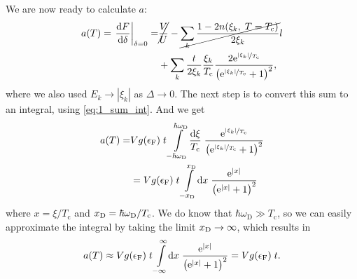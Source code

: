 \documentclass[11pt,letter, swedish, english
]{article}
\newcommand{\Tc}{\ensuremath{T_{\text{c}}}}
\newcommand{\eF}{\ensuremath{\epsilon_{\text{F}}}}
\newcommand{\wD}{\ensuremath{\omega_{\text{D}}}}
\begin{document}
We are now ready to calculate $a$:
\begin{equation}
\begin{aligned}
a(T)=\eval{\dv{F}{\delta}}_{\delta=0}
=&\cancel{\frac{V}{U}}
-\cancel{\sum_k\frac{1-2n(\xi_k,\;T=\Tc)}{2\xi_k}}l\\
&+\sum_k\frac{t}{2\xi_k}\frac{\xi_k}{\Tc}
\frac{2\ee^{\nicefrac{|\xi_k|}{\Tc}}}{\qty(\ee^{\nicefrac{|\xi_k|}{\Tc}}+1)^2},
\end{aligned}
\end{equation}
where we also used $E_k\to|\xi_k|$ as $\Delta\to0$.
The next step is to convert this sum to an integral, using
\eqref{eq:1_sum_int}. 
And we get
\begin{equation}
\begin{aligned}
a(T)=&Vg(\eF)\;t\int_{-\hbar\wD}^{\hbar\wD}\!\frac{\rd\xi}{\Tc}\;
\frac{\ee^{\nicefrac{|\xi_k|}{\Tc}}}{\qty(\ee^{\nicefrac{|\xi_k|}{\Tc}}+1)^2}\\
&=Vg(\eF)\;t\int_{-\xD}^{\xD}\!\rd{x}\;
\frac{\ee^{|x|}}{\qty(\ee^{|x|}+1)^2}\\
\end{aligned}
\end{equation}
where $x=\xi/\Tc$ and $\xD=\hbar\wD/\Tc$. We do know that
$\hbar\wD\gg\Tc$, so we can easily approximate the integral by taking
the limit $x_{\text{D}}\to\infty$, which results in
\begin{equation}\label{eq:2_a}
\begin{aligned}
a(T)\approx Vg(\eF)\;t\int_{-\infty}^{\infty}\!\rd{x}\;
\frac{\ee^{|x|}}{\qty(\ee^{|x|}+1)^2}
=Vg(\eF)\;t.
\end{aligned}
\end{equation}

\end{document}
